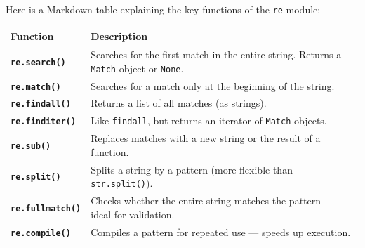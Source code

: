 \documentclass[
  english,
  letterpaper,
  DIV=11,
  numbers=noendperiod]{scrreprt}
\newcounter{none} %
\begin{document}
Here is a Markdown table explaining the key functions of the \texttt{re}
module:

{\def\LTcaptype{none} %
\begin{longtable}[]{@{}
  >{\raggedright\arraybackslash}p{}
  >{\raggedright\arraybackslash}p{}@{}}
\toprule\noalign{}
\begin{minipage}[b]{\linewidth}\raggedright
Function
\end{minipage} & \begin{minipage}[b]{\linewidth}\raggedright
Description
\end{minipage} \\
\midrule\noalign{}
\endhead
\bottomrule\noalign{}
\endlastfoot
\textbf{\texttt{re.search()}} & Searches for the first match in the
entire string. Returns a \texttt{Match} object or \texttt{None}. \\
\textbf{\texttt{re.match()}} & Searches for a match only at the
beginning of the string. \\
\textbf{\texttt{re.findall()}} & Returns a list of all matches (as
strings). \\
\textbf{\texttt{re.finditer()}} & Like \texttt{findall}, but returns an
iterator of \texttt{Match} objects. \\
\textbf{\texttt{re.sub()}} & Replaces matches with a new string or the
result of a function. \\
\textbf{\texttt{re.split()}} & Splits a string by a pattern (more
flexible than \texttt{str.split()}). \\
\textbf{\texttt{re.fullmatch()}} & Checks whether the entire string
matches the pattern --- ideal for validation. \\
\textbf{\texttt{re.compile()}} & Compiles a pattern for repeated use ---
speeds up execution. \\
\end{longtable}
}
\end{document}
